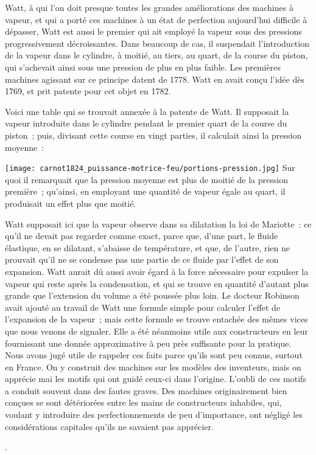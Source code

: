 \documentclass[french,twoside]{book} %
\begin{document}
{ Watt, à qui l’on doit presque toutes les grandes améliorations des machines à vapeur, et qui a porté ces machines à un état de perfection aujourd’hui difficile à dépasser, Watt est aussi le premier qui ait employé la vapeur sous des pressions progressivement décroissantes. Dans beaucoup de cas, il suspendait l’introduction de la vapeur dans le cylindre, à moitié, au tiers, au quart, de la course du piston, qui s’achevait ainsi sous une pression de plus en plus faible. Les premières machines agissant sur ce principe datent de 1778. Watt en avait conçu l’idée dès 1769, et prit patente pour cet objet en 1782.\par
 Voici une table qui se trouvait annexée à la patente de Watt. Il supposait la vapeur introduite dans le cylindre pendant le premier quart de la course du piston ; puis, divisant cette course en vingt parties, il calculait ainsi la pression moyenne :\par
   \texttt{[image: carnot1824\_puissance-motrice-feu/portions-pression.jpg]}
 \noindent Sur quoi il remarquait que la pression moyenne est plus de moitié de la pression première ; qu’ainsi, en employant une quantité de vapeur égale au quart, il produisait un effet plus que moitié.\par
 Watt supposait ici que la vapeur observe dans sa dilatation la loi de Mariotte : ce qu’il ne devait pas regarder comme exact, parce que, d’une part, le fluide élastique, en se dilatant, s’abaisse de température, et que, de l’autre, rien ne prouvait qu’il ne se condense pas une partie de ce fluide par l’effet de son expansion. Watt aurait dû aussi avoir égard à la force nécessaire pour expulser la vapeur qui reste après la condensation, et qui se trouve en quantité d’autant plus grande que l’extension du volume a été poussée plus loin. Le docteur Robinson avait ajouté au travail de Watt une formule simple pour calculer l’effet de l’expansion de la vapeur ; mais cette formule se trouve entachée des mêmes vices que nous venons de signaler. Elle a été néanmoins utile aux constructeurs en leur fournissant une donnée approximative à peu près suffisante pour la pratique. Nous avons jugé utile de rappeler ces faits parce qu’ils sont peu connus, surtout en France. On y construit des machines sur les modèles des inventeurs, mais on apprécie mai les motifs qui ont guidé ceux-ci dans l’origine. L’oubli de ces motifs a conduit souvent dans des fautes graves. Des machines originairement bien conçues se sont détériorées entre les mains de constructeurs inhabiles, qui, voulant y introduire des perfectionnements de peu d’importance, ont négligé les considérations capitales qu’ils ne savaient pas apprécier.
 }.\par
\end{document}
